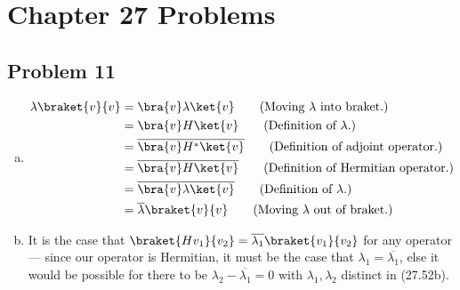 \documentclass[10pt]{mypackage}
\begin{document}
\RaggedRight
\section{Chapter 27 Problems}%
\subsection{Problem 11}%
\begin{enumerate}[(a)]
  \item 
    \begin{align*}
      \lambda \braket{v}{v} &= \bra{v}\lambda \ket{v} \tag{Moving $\lambda$ into braket.}\\
                            &= \bra{v}H\ket{v} \tag{Definition of $\lambda$.}\\
                            &= \overline{\bra{v}H^{\ast}\ket{v}} \tag{Definition of adjoint operator.}\\
                            &= \overline{\bra{v}H\ket{v}} \tag{Definition of Hermitian operator.}\\
                            &= \overline{\bra{v}\lambda\ket{v}} \tag{Definition of $\lambda$.}\\
                            &= \overline{\lambda}\braket{v}{v}\tag{Moving $\lambda$ out of braket.}
    \end{align*}
  \item It is the case that $\braket{Hv_1}{v_2} = \overline{\lambda_1}\braket{v_1}{v_2}$ for any operator --- since our operator is Hermitian, it must be the case that $\lambda_1 = \overline{\lambda_1}$, else it would be possible for there to be $\lambda_2 - \overline{\lambda_1} = 0$ with $\lambda_1,\lambda_2$ distinct in (27.52b).
\end{enumerate}
\end{document}
